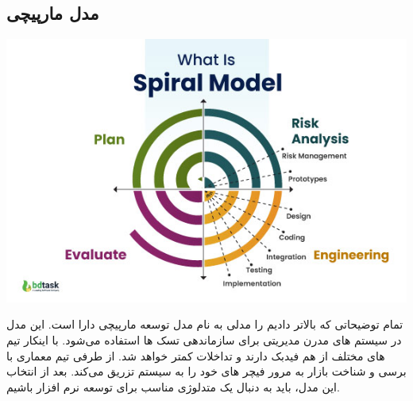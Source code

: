 \subsection{مدل مارپیچی}
\includegraphics{assets/spiral_model.jpg}

تمام توضیحاتی که بالاتر دادیم را مدلی به نام مدل توسعه مارپیچی دارا است. این مدل در سیستم های مدرن مدیریتی برای سازماندهی تسک ها استفاده می‌شود.
با اینکار تیم های مختلف از هم فیدبک دارند و تداخلات کمتر خواهد شد. از طرفی تیم معماری با برسی و شناخت بازار به مرور فیچر های خود را به سیستم تزریق می‌کند.
بعد از انتخاب این مدل، باید به دنبال یک متدلوژی مناسب برای توسعه نرم افزار باشیم.
